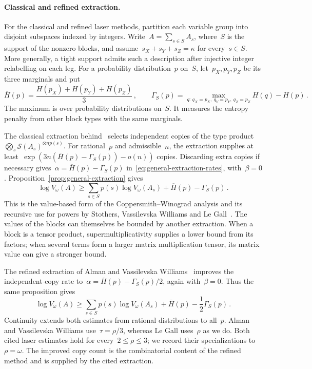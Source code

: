 \documentclass[11pt,letterpaper]{article}
\theoremstyle{definition}
\numberwithin{equation}{section}
\begin{document}
\paragraph{Classical and refined extraction.}
For the classical and refined laser methods, partition each variable group into disjoint subspaces indexed by integers. Write~$A=\sum_{s\in S}A_s$, where~$S$ is the support of the nonzero blocks, and assume~$s_X+s_Y+s_Z=\kappa$ for every~$s\in S$. More generally, a tight support admits such a description after injective integer relabelling on each leg. For a probability distribution~$p$ on~$S$, let~$p_X,p_Y,p_Z$ be its three marginals and put
\begin{equation}\label{eq:laser-compatibility}
 \overline H(p)=\frac{H(p_X)+H(p_Y)+H(p_Z)}3\,,\qquad
 \Gamma_S(p)=\max_{q:\,q_X=p_X,\ q_Y=p_Y,\ q_Z=p_Z}H(q)-H(p)\,.
\end{equation}
The maximum is over probability distributions on~$S$. It measures the entropy penalty from other block types with the same marginals.

The classical extraction behind~\cite[Theorem 4.1 and Appendix A.3]{LG14} selects independent copies of the type product~$\bigotimes_s\mathcal S(A_s)^{\otimes np(s)}$. For rational~$p$ and admissible~$n$, the extraction supplies at least~$\exp(3n(\overline H(p)-\Gamma_S(p))-o(n))$ copies. Discarding extra copies if necessary gives~$\alpha=\overline H(p)-\Gamma_S(p)$ in~\eqref{eq:general-extraction-rates}, with~$\beta=0$. Proposition~\ref{prop:general-extraction} gives
\begin{equation}\label{eq:classical-laser-value}
 \log V_\omega(A)\geq
 \sum_{s\in S}p(s)\log V_\omega(A_s)+\overline H(p)-\Gamma_S(p)\,.
\end{equation}
This is the value-based form of the Coppersmith--Winograd analysis and its recursive use for powers by Stothers, Vassilevska Williams and Le Gall~\cite{CW90,Sto10,DS13,VW12,LG14}. The values of the blocks can themselves be bounded by another extraction. When a block is a tensor product, supermultiplicativity supplies a lower bound from its factors; when several terms form a larger matrix multiplication tensor, its matrix value can give a stronger bound.

The refined extraction of Alman and Vassilevska Williams~\cite[Theorem 4.1 and Sections 4.1--4.5]{AW21} improves the independent-copy rate to~$\alpha=\overline H(p)-\Gamma_S(p)/2$, again with~$\beta=0$. Thus the same proposition gives
\begin{equation}\label{eq:refined-laser-value}
 \log V_\omega(A)\geq
 \sum_{s\in S}p(s)\log V_\omega(A_s)+\overline H(p)-\frac12\Gamma_S(p)\,.
\end{equation}
Continuity extends both estimates from rational distributions to all~$p$. Alman and Vassilevska Williams use~$\tau=\rho/3$, whereas Le Gall uses~$\rho$ as we do. Both cited laser estimates hold for every~$2\leq\rho\leq3$; we record their specializations to~$\rho=\omega$. The improved copy count is the combinatorial content of the refined method and is supplied by the cited extraction.
\end{document}
